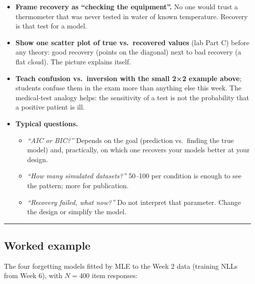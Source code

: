 \begin{itemize}
\tightlist
\item
  \textbf{Frame recovery as ``checking the equipment''.} No one would
  trust a thermometer that was never tested in water of known
  temperature. Recovery is that test for a model.
\item
  \textbf{Show one scatter plot of true vs.~recovered values} (lab Part
  C) before any theory: good recovery (points on the diagonal) next to
  bad recovery (a flat cloud). The picture explains itself.
\item
  \textbf{Teach confusion vs.~inversion with the small 2×2 example
  above}; students confuse them in the exam more than anything else this
  week. The medical-test analogy helps: the sensitivity of a test is not
  the probability that a positive patient is ill.
\item
  \textbf{Typical questions.}

  \begin{itemize}
  \tightlist
  \item
    \emph{``AIC or BIC?''} Depends on the goal (prediction vs.~finding
    the true model) and, practically, on which one recovers your models
    better at your design.
  \item
    \emph{``How many simulated datasets?''} 50--100 per condition is
    enough to see the pattern; more for publication.
  \item
    \emph{``Recovery failed, what now?''} Do not interpret that
    parameter. Change the design or simplify the model.
  \end{itemize}
\end{itemize}

\begin{center}\rule{0.5\linewidth}{0.5pt}\end{center}

\subsection{Worked example}

The four forgetting models fitted by MLE to the Week 2 data (training
NLLs from Week 6), with \(N = 400\) item responses:

